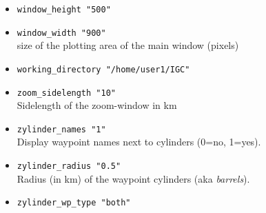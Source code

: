 \begin{itemize}
\item \texttt{window\_height "500"} \\
\item \texttt{window\_width "900"} \\
size of the plotting area of the main window (pixels)


\item \texttt{working\_directory    "/home/user1/IGC"}
\item \texttt{zoom\_sidelength    "10"}\\
    Sidelength of the zoom-window in km

\item \texttt{zylinder\_names    "1"}\\
 Display waypoint names next to cylinders (0=no, 1=yes).
 
\item \texttt{zylinder\_radius    "0.5"}\\
 Radius (in km) of the waypoint cylinders (aka \emph{barrels}).

\item \texttt{zylinder\_wp\_type    "both"}

\end{itemize}

